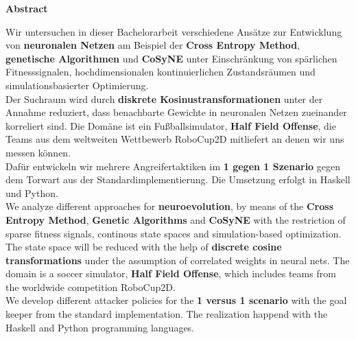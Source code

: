 %
%
\vspace*{2cm}

\begin{center}
    \textbf{Abstract}
\end{center}

\vspace*{1cm}

\noindent Wir untersuchen in dieser Bachelorarbeit verschiedene Ansätze zur Entwicklung von \textbf{neuronalen Netzen} am Beispiel der \textbf{Cross Entropy Method}, \textbf{genetische Algorithmen} und \textbf{CoSyNE} unter Einschränkung von spärlichen Fitnesssignalen, hochdimensionalen kontinuierlichen Zustandsräumen und simulationsbasierter Optimierung. \\[2mm]
\noindent
Der Suchraum wird durch \textbf{diskrete Kosinustransformationen} unter der Annahme reduziert, dass benachbarte Gewichte in neuronalen Netzen zueinander korreliert sind. Die Domäne ist ein Fußballsimulator, \textbf{Half Field Offense}, die Teams aus dem weltweiten Wettbewerb RoboCup2D mitliefert an denen wir uns messen können. \\[2mm]
\noindent
Dafür entwickeln wir mehrere Angreifertaktiken im \textbf{1 gegen 1 Szenario} gegen dem Torwart aus der Standardimplementierung. Die Umsetzung erfolgt in Haskell und Python. \\[10mm]


\noindent
We analyze different approaches for \textbf{neuroevolution}, by means of the \textbf{Cross Entropy Method}, \textbf{Genetic Algorithms} and \textbf{CoSyNE} with the restriction of sparse fitness signals, continous state spaces and simulation-based optimization. \\[2mm]
\noindent
The state space will be reduced with the help of \textbf{discrete cosine transformations} under the assumption of correlated weights in neural nets. The domain is a soccer simulator, \textbf{Half Field Offense}, which includes teams from the worldwide competition RoboCup2D. \\[2mm]
\noindent
We develop different attacker policies for the \textbf{1 versus 1 scenario} with the goal keeper from the standard implementation. The realization happend with the Haskell and Python programming languages.






